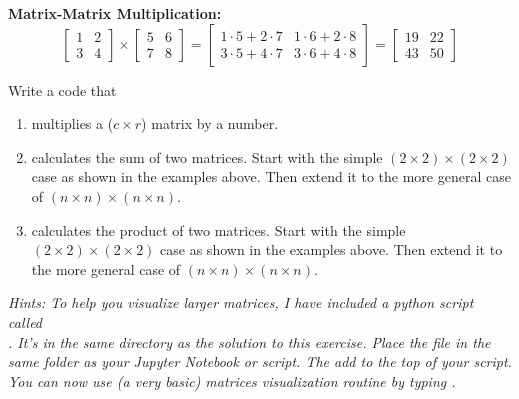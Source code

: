 \textbf{Matrix-Matrix Multiplication:}
\[
  \begin{bmatrix}
    1 & 2\\
    3 & 4
  \end{bmatrix} \times
  \begin{bmatrix}
    5 & 6\\
    7 & 8
  \end{bmatrix} =
  \begin{bmatrix}
    1 \cdot 5 + 2 \cdot 7 & 1 \cdot 6 + 2 \cdot 8\\
    3 \cdot 5 + 4 \cdot 7 & 3 \cdot 6 + 4 \cdot 8
  \end{bmatrix} =
  \begin{bmatrix}
    19 & 22\\
    43 & 50
  \end{bmatrix}
\]



Write a code that
\begin{enumerate}[label=(\alph*)]
	\item multiplies a ($c \times r$) matrix by a number.
	\item calculates the sum of two matrices. Start with the simple $(2 \times 2) \times (2 \times 2)$ case as shown in the examples above. Then extend it to the more general case of $(n \times n) \times (n \times n)$.
	\item calculates the product of two matrices. Start with the simple $(2 \times 2) \times (2 \times 2)$ case as shown in the examples above. Then extend it to the more general case of $(n \times n) \times (n \times n)$.
\end{enumerate}


\textit{Hints:
To help you visualize larger matrices, I have included a python script called\\
{}. It's in the same directory as the solution to this exercise. Place the file in the same folder as your Jupyter Notebook or script. The add {} to the top of your script. You can now use (a very basic) matrices visualization routine by typing {}.}